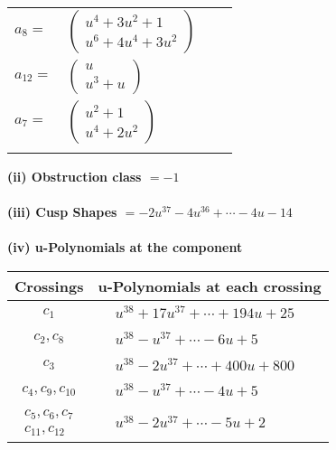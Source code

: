 \documentclass[1p]{elsarticle_modified}
\theoremstyle{definition}
\begin{document}
\begin{tabular}{m{7pt} m{180pt} m{7pt} m{180pt} }
\flushright $a_{8}=$&$\begin{pmatrix}u^4+3 u^2+1\\u^6+4 u^4+3 u^2\end{pmatrix}$ \\
\flushright $a_{12}=$&$\begin{pmatrix}u\\u^3+u\end{pmatrix}$ \\
\flushright $a_{7}=$&$\begin{pmatrix}u^2+1\\u^4+2 u^2\end{pmatrix}$\\&\end{tabular}
\flushleft \textbf{(ii) Obstruction class $= -1$}\\~\\
\flushleft \textbf{(iii) Cusp Shapes $= -2 u^{37}-4 u^{36}+\cdots-4 u-14$}\\~\\
\newpage\renewcommand{\arraystretch}{1}
\flushleft \textbf{(iv) u-Polynomials at the component}\newline \\
\begin{tabular}{m{50pt}|m{274pt}}
Crossings & \hspace{64pt}u-Polynomials at each crossing \\
\hline $$\begin{aligned}c_{1}\end{aligned}$$&$\begin{aligned}
&u^{38}+17 u^{37}+\cdots+194 u+25
\end{aligned}$\\
\hline $$\begin{aligned}c_{2},c_{8}\end{aligned}$$&$\begin{aligned}
&u^{38}- u^{37}+\cdots-6 u+5
\end{aligned}$\\
\hline $$\begin{aligned}c_{3}\end{aligned}$$&$\begin{aligned}
&u^{38}-2 u^{37}+\cdots+400 u+800
\end{aligned}$\\
\hline $$\begin{aligned}c_{4},c_{9},c_{10}\end{aligned}$$&$\begin{aligned}
&u^{38}- u^{37}+\cdots-4 u+5
\end{aligned}$\\
\hline $$\begin{aligned}c_{5},c_{6},c_{7}\\c_{11},c_{12}\end{aligned}$$&$\begin{aligned}
&u^{38}-2 u^{37}+\cdots-5 u+2
\end{aligned}$\\
\hline
\end{tabular}\\~\\
\end{document}
